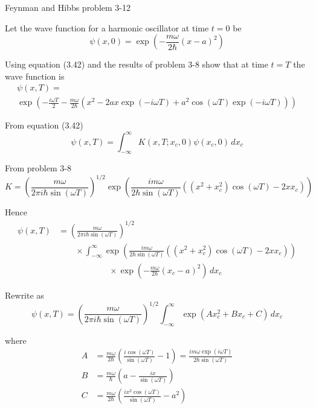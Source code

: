 \documentclass[12pt]{article}
\begin{document}
Feynman and Hibbs problem 3-12

\bigskip
Let the wave function for a harmonic oscillator at time $t=0$ be
\begin{equation*}
\psi(x,0)=\exp\left(-\frac{m\omega}{2\hbar}(x-a)^2\right)
\end{equation*}

Using equation (3.42) and the results of problem 3-8 show that
at time $t=T$ the wave function is
\begin{multline*}
\psi(x,T)=
\\
\exp\left(
-\frac{i\omega T}{2}-\frac{m\omega}{2\hbar}
\left(x^2-2ax\exp(-i\omega T)+a^2\cos(\omega T)\exp(-i\omega T)\right)
\right)
\end{multline*}

From equation (3.42)
\begin{equation*}
\psi(x,T)=\int_{-\infty}^\infty K(x,T;x_c,0)\psi(x_c,0)\,dx_c
\end{equation*}

From problem 3-8
\begin{equation*}
K=\left(\frac{m\omega}{2\pi i\hbar\sin(\omega T)}\right)^{1/2}
\exp\left(
\frac{im\omega}{2\hbar\sin(\omega T)}\left((x^2+x_c^2)\cos(\omega T)-2xx_c\right)
\right)
\end{equation*}

Hence
\begin{align*}
\psi(x,T)&=\left(\frac{m\omega}{2\pi i\hbar\sin(\omega T)}\right)^{1/2}
\\
&\qquad{}\times
\int_{-\infty}^\infty \exp\left(
\frac{im\omega}{2\hbar\sin(\omega T)}\left((x^2+x_c^2)\cos(\omega T)-2xx_c\right)
\right)
\\
&\qquad\qquad\qquad{}\times
\exp\left(-\frac{m\omega}{2\hbar}(x_c-a)^2\right)\,dx_c
\end{align*}

Rewrite as
\begin{equation*}
\psi(x,T)=\left(\frac{m\omega}{2\pi i\hbar\sin(\omega T)}\right)^{1/2}
\int_{-\infty}^\infty\exp(Ax_c^2+Bx_c+C)\,dx_c
\tag{1}
\end{equation*}

where
\begin{align*}
A&=\frac{m\omega}{2\hbar}\left(\frac{i\cos(\omega T)}{\sin(\omega T)}-1\right)
=\frac{im\omega\exp(i\omega T)}{2\hbar\sin(\omega T)}
\\
B&=\frac{m\omega}{\hbar}\left(a-\frac{ix}{\sin(\omega T)}\right)
\\
C&=\frac{m\omega}{2\hbar}\left(\frac{ix^2\cos(\omega T)}{\sin(\omega T)}-a^2\right)
\end{align*}
\end{document}
